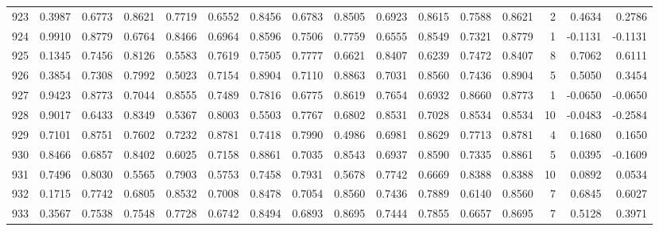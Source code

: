 \begin{tabular}{lrrrrrrrrrrrrrrr}
923 &      0.3987 &  0.6773 &  0.8621 &  0.7719 &  0.6552 &  0.8456 &  0.6783 &  0.8505 &  0.6923 &  0.8615 &   0.7588 &     0.8621 &      2 &                    0.4634 &                     0.2786 \\
924 &      0.9910 &  0.8779 &  0.6764 &  0.8466 &  0.6964 &  0.8596 &  0.7506 &  0.7759 &  0.6555 &  0.8549 &   0.7321 &     0.8779 &      1 &                   -0.1131 &                    -0.1131 \\
925 &      0.1345 &  0.7456 &  0.8126 &  0.5583 &  0.7619 &  0.7505 &  0.7777 &  0.6621 &  0.8407 &  0.6239 &   0.7472 &     0.8407 &      8 &                    0.7062 &                     0.6111 \\
926 &      0.3854 &  0.7308 &  0.7992 &  0.5023 &  0.7154 &  0.8904 &  0.7110 &  0.8863 &  0.7031 &  0.8560 &   0.7436 &     0.8904 &      5 &                    0.5050 &                     0.3454 \\
927 &      0.9423 &  0.8773 &  0.7044 &  0.8555 &  0.7489 &  0.7816 &  0.6775 &  0.8619 &  0.7654 &  0.6932 &   0.8660 &     0.8773 &      1 &                   -0.0650 &                    -0.0650 \\
928 &      0.9017 &  0.6433 &  0.8349 &  0.5367 &  0.8003 &  0.5503 &  0.7767 &  0.6802 &  0.8531 &  0.7028 &   0.8534 &     0.8534 &     10 &                   -0.0483 &                    -0.2584 \\
929 &      0.7101 &  0.8751 &  0.7602 &  0.7232 &  0.8781 &  0.7418 &  0.7990 &  0.4986 &  0.6981 &  0.8629 &   0.7713 &     0.8781 &      4 &                    0.1680 &                     0.1650 \\
930 &      0.8466 &  0.6857 &  0.8402 &  0.6025 &  0.7158 &  0.8861 &  0.7035 &  0.8543 &  0.6937 &  0.8590 &   0.7335 &     0.8861 &      5 &                    0.0395 &                    -0.1609 \\
931 &      0.7496 &  0.8030 &  0.5565 &  0.7903 &  0.5753 &  0.7458 &  0.7931 &  0.5678 &  0.7742 &  0.6669 &   0.8388 &     0.8388 &     10 &                    0.0892 &                     0.0534 \\
932 &      0.1715 &  0.7742 &  0.6805 &  0.8532 &  0.7008 &  0.8478 &  0.7054 &  0.8560 &  0.7436 &  0.7889 &   0.6140 &     0.8560 &      7 &                    0.6845 &                     0.6027 \\
933 &      0.3567 &  0.7538 &  0.7548 &  0.7728 &  0.6742 &  0.8494 &  0.6893 &  0.8695 &  0.7444 &  0.7855 &   0.6657 &     0.8695 &      7 &                    0.5128 &                     0.3971 \\

\end{tabular}
